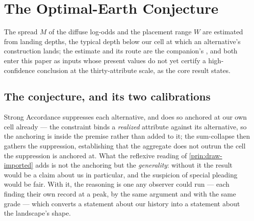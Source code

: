 \documentclass[11pt]{article}
\theoremstyle{definition}
\begin{document}
\section{The Optimal-Earth Conjecture}
\label{sec:oec}

\label{sec:landing-depths}
The spread $M$ of the diffuse log-odds and the placement range $W$ are estimated from landing depths, the typical depth below our cell at which an alternative's construction lands; the estimate and its route are the companion's \cite{Nexus}, and both enter this paper as inputs whose present values do not yet certify a high-confidence conclusion at the thirty-attribute scale, as the core result states.


\subsection{The conjecture, and its two calibrations}
\label{sec:oec-conjecture}
Strong Accordance suppresses each alternative, and does so anchored at our own cell already --- the constraint binds a \emph{realized} attribute against its alternative, so the anchoring is inside the premise rather than added to it; the sum-collapse then gathers the suppression, establishing that the aggregate does not outrun the cell the suppression is anchored at. What the reflexive reading of \autoref{prin:draw-imported} adds is not the anchoring but the \emph{generality}: without it the result would be a claim about us in particular, and the suspicion of special pleading would be fair. With it, the reasoning is one any observer could run --- each finding their own record at a peak, by the same argument and with the same grade --- which converts a statement about our history into a statement about the landscape's shape.
\end{document}
